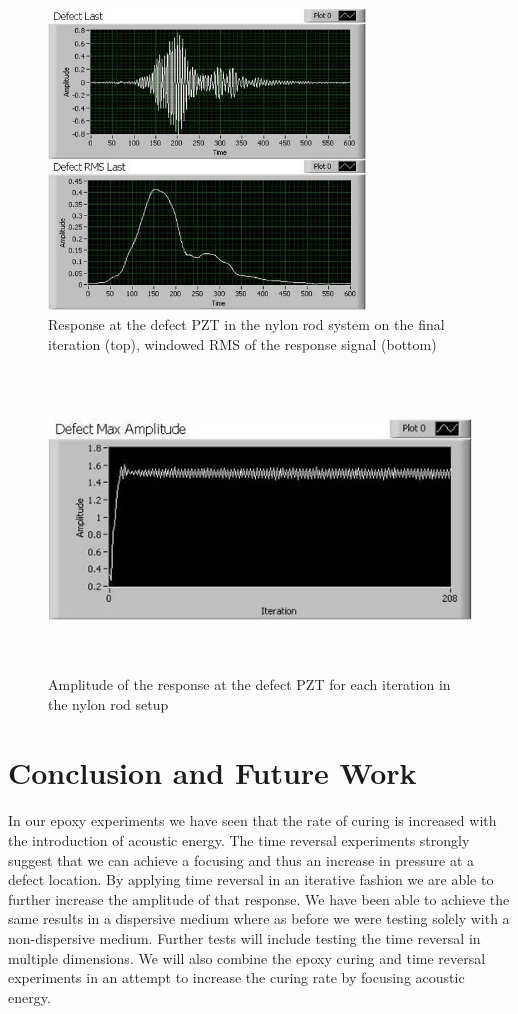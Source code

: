 \documentclass[]{aiaa-tc}%
\begin{document}
\begin{figure}[H]%
\centering
 \includegraphics[height = 8cm]{nylon_final}
 \caption{Response at the defect PZT in the nylon rod system on the final iteration (top), windowed RMS of the response signal (bottom)}
 \label{fig:nylon_final}
\end{figure}


\begin{figure}[H]%
\centering
 \includegraphics[height = 8cm]{nylon_amps}
 \caption{Amplitude of the response at the defect PZT for each iteration in the nylon rod setup}
 \label{fig:nylon_amps}
\end{figure}

\section{Conclusion and Future Work}

In our epoxy experiments we have seen that the rate of curing is increased with the introduction of acoustic energy. The time reversal experiments strongly suggest that we can achieve a focusing and thus an increase in pressure at a defect location. By applying time reversal in an iterative fashion we are able to further increase the amplitude of that response. We have been able to achieve the same results in a dispersive medium where as before we were testing solely with a non-dispersive medium. Further tests will include testing the time reversal in multiple dimensions. We will also combine the epoxy curing and time reversal experiments in an attempt to increase the curing rate by focusing acoustic energy.
\end{document}
